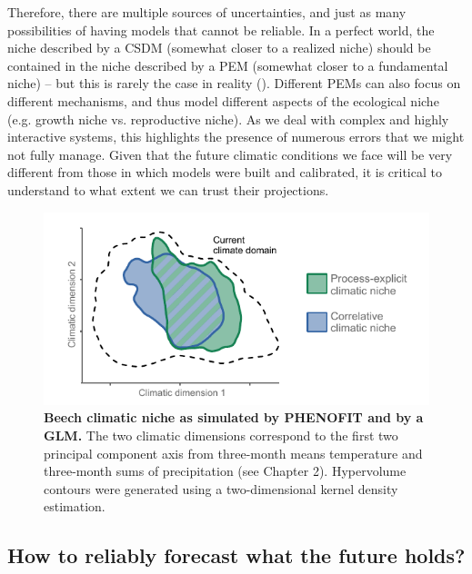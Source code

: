 Therefore, there are multiple sources of uncertainties, and just as many possibilities of having models that cannot be reliable. In a perfect world, the niche described by a CSDM (somewhat closer to a realized niche) should be contained in the niche described by a PEM (somewhat closer to a fundamental niche) -- but this is rarely the case in reality (). Different PEMs can also focus on different mechanisms, and thus model different aspects of the ecological niche (e.g. growth niche vs. reproductive niche). As we deal with complex and highly interactive systems, this highlights the presence of numerous errors that we might not fully manage. Given that the future climatic conditions we face will be very different from those in which models were built and calibrated, it is critical to understand to what extent we can trust their projections.

\begin{figure}[h]
\vspace*{-0cm}
\hspace*{0cm}
\centering
\includegraphics{0introduction/figs/csdmvspbmniche.pdf}
\caption{\textbf{Beech climatic niche as simulated by PHENOFIT and by a GLM.} The two climatic dimensions correspond to the first two principal component axis from three-month means temperature and three-month sums of precipitation (see Chapter 2). Hypervolume contours were generated using a two-dimensional kernel density estimation.}
\label{fig:csdmvspbmniche}
\end{figure}

\subsection{How to reliably forecast what the future holds?}

